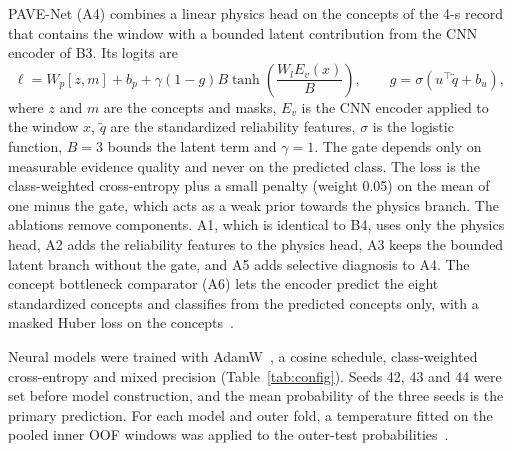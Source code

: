 \documentclass[10pt,letterpaper]{article}
\begin{document}
PAVE-Net (A4) combines a linear physics head on the concepts of the 4-s record that contains the window with a bounded latent contribution from the CNN encoder of B3. Its logits are
\begin{equation}
\ell = W_p [z, m] + b_p + \gamma (1 - g) B \tanh\left(\frac{W_l E_v(x)}{B}\right), \qquad g = \sigma\left(u^{\top} \tilde{q} + b_u\right),
\label{eq:fusion}
\end{equation}
where $z$ and $m$ are the concepts and masks, $E_v$ is the CNN encoder applied to the window $x$, $\tilde{q}$ are the standardized reliability features, $\sigma$ is the logistic function, $B = 3$ bounds the latent term and $\gamma = 1$. The gate depends only on measurable evidence quality and never on the predicted class. The loss is the class-weighted cross-entropy plus a small penalty (weight 0.05) on the mean of one minus the gate, which acts as a weak prior towards the physics branch. The ablations remove components. A1, which is identical to B4, uses only the physics head, A2 adds the reliability features to the physics head, A3 keeps the bounded latent branch without the gate, and A5 adds selective diagnosis to A4. The concept bottleneck comparator (A6) lets the encoder predict the eight standardized concepts and classifies from the predicted concepts only, with a masked Huber loss on the concepts~\cite{koh2020concept}.

Neural models were trained with AdamW~\cite{loshchilov2019decoupled}, a cosine schedule, class-weighted cross-entropy and mixed precision (Table~\ref{tab:config}). Seeds 42, 43 and 44 were set before model construction, and the mean probability of the three seeds is the primary prediction. For each model and outer fold, a temperature fitted on the pooled inner OOF windows was applied to the outer-test probabilities~\cite{guo2017calibration}.
\end{document}
